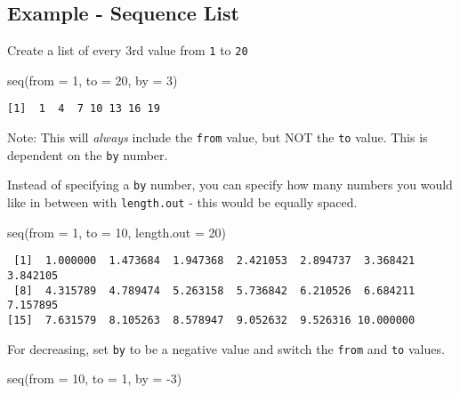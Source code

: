 \documentclass[
  letterpaper,
  DIV=11,
  numbers=noendperiod]{scrreprt}
\newenvironment{Shaded}{\begin{snugshade}}{\end{snugshade}}
\newcommand{\AttributeTok}[1]{\textcolor[rgb]{0.40,0.45,0.13}{#1}}
\newcommand{\DecValTok}[1]{\textcolor[rgb]{0.68,0.00,0.00}{#1}}
\newcommand{\FunctionTok}[1]{\textcolor[rgb]{0.28,0.35,0.67}{#1}}
\newcommand{\NormalTok}[1]{\textcolor[rgb]{0.00,0.23,0.31}{#1}}
\newcommand{\SpecialCharTok}[1]{\textcolor[rgb]{0.37,0.37,0.37}{#1}}
\begin{document}
\subsection*{Example - Sequence List}\label{example---sequence-list}

Create a list of every 3rd value from \texttt{1} to \texttt{20}

\begin{Shaded}
\begin{Highlighting}[]
\FunctionTok{seq}\NormalTok{(}\AttributeTok{from =} \DecValTok{1}\NormalTok{, }\AttributeTok{to =} \DecValTok{20}\NormalTok{, }\AttributeTok{by =} \DecValTok{3}\NormalTok{)}
\end{Highlighting}
\end{Shaded}

\begin{verbatim}
[1]  1  4  7 10 13 16 19
\end{verbatim}

Note: This will \emph{always} include the \texttt{from} value, but NOT
the \texttt{to} value. This is dependent on the \texttt{by} number.

Instead of specifying a \texttt{by} number, you can specify how many
numbers you would like in between with \texttt{length.out} - this would
be equally spaced.

\begin{Shaded}
\begin{Highlighting}[]
\FunctionTok{seq}\NormalTok{(}\AttributeTok{from =} \DecValTok{1}\NormalTok{, }\AttributeTok{to =} \DecValTok{10}\NormalTok{, }\AttributeTok{length.out =} \DecValTok{20}\NormalTok{)}
\end{Highlighting}
\end{Shaded}

\begin{verbatim}
 [1]  1.000000  1.473684  1.947368  2.421053  2.894737  3.368421  3.842105
 [8]  4.315789  4.789474  5.263158  5.736842  6.210526  6.684211  7.157895
[15]  7.631579  8.105263  8.578947  9.052632  9.526316 10.000000
\end{verbatim}

For decreasing, set \texttt{\textasciigrave{}by\textasciigrave{}} to be
a negative value and switch the \texttt{from} and \texttt{to} values.

\begin{Shaded}
\begin{Highlighting}[]
\FunctionTok{seq}\NormalTok{(}\AttributeTok{from =} \DecValTok{10}\NormalTok{, }\AttributeTok{to =} \DecValTok{1}\NormalTok{, }\AttributeTok{by =} \SpecialCharTok{{-}}\DecValTok{3}\NormalTok{)}
\end{Highlighting}
\end{Shaded}
\end{document}

